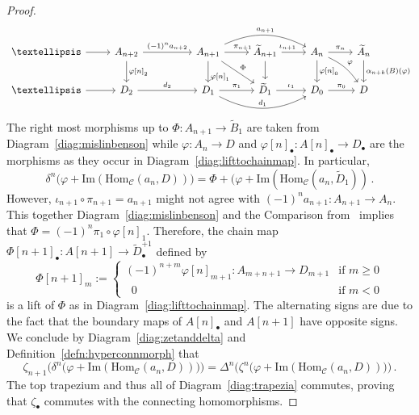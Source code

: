 \documentclass[12pt,a4paper]{article}
\numberwithin{equation}{section}
\theoremstyle{nonumberplain}
\newtheorem{proof}{Proof}
\begin{document}
\begin{proof}
\begin{equation}
\begin{tikzcd}
    {} \dots {} \arrow[r]
    & A_{n+2} \arrow[rr, "(-1)^n a_{n+2}"] \arrow[d, "\varphi{[}n{]}_2"]
    & & A_{n+1} \arrow[r, "\pi_{n+1}" near end] \arrow[rr, bend left = 26, "a_{n+1}"] \arrow[d, "\varphi{[}n{]}_1" near end] \arrow[dr, "\Phi"]
    & \widetilde{A}_{n+1} \arrow[r, "\iota_{n+1}" near start] \arrow[d]
    & A_n \arrow[r, "\pi_n"] \arrow[dr, bend left = 15, "\varphi"] \arrow[d, "\varphi{[}n{]}_0"]
    & \widetilde{A}_n \arrow[d, "\alpha_{n+k}(B)(\varphi)"] \\
    {} \dots {} \arrow[r]
    & D_2 \arrow[rr, "d_2"]
    & & D_1 \arrow[r, "\pi_1"] \arrow[rr, bend right = 28, "d_1"]
    & \widetilde{D}_1 \arrow[r, "\iota_1"]
    & D_0 \arrow[r, "\pi_0"]
    & D
\end{tikzcd}
\end{equation}
The right most morphisms up to $\Phi: A_{n+1} \rightarrow \widetilde{B}_1$ are taken from Diagram~\ref{diag:mislinbenson} while $\varphi: A_n \rightarrow D$ and $\varphi[n]_{\bullet}: A[n]_{\bullet} \rightarrow D_{\bullet}$ are the morphisms as they occur in Diagram~\ref{diag:lifttochainmap}. In particular,
\[ \delta^n \big(\varphi+\mathrm{Im}(\mathrm{Hom}_{\mathcal{C}}(a_n, D))\big) = \Phi+\big(\varphi+\mathrm{Im}(\mathrm{Hom}_{\mathcal{C}}(a_n, \widetilde{D}_1)) \, . \]
However, $\iota_{n+1} \circ \pi_{n+1} = a_{n+1}$ might not agree with $(-1)^n a_{n+1}: A_{n+1} \rightarrow A_n$. This together Diagram~\ref{diag:mislinbenson} and the Comparison from~\cite[p.~36]{wei94} implies that $\Phi = (-1)^n \pi_1 \circ \varphi[n]_1$. Therefore, the chain map $\Phi[n+1]_{\bullet}: A[n+1] \rightarrow \widetilde{D}_{\bullet}^{+1}$ defined by
\[ \Phi[n+1]_m := \begin{cases} (-1)^{n+m} \varphi[n]_{m+1}: A_{m+n+1} \rightarrow D_{m+1} &\text{if } m \geq 0 \\ \; \; 0 &\text{if } m < 0 \end{cases} \]
is a lift of $\Phi$ as in Diagram~\ref{diag:lifttochainmap}. The alternating signs are due to the fact that the boundary maps of $A[n]_{\bullet}$ and $A[n+1]$ have opposite signs. We conclude by Diagram~\ref{diag:zetanddelta} and Definition~\ref{defn:hyperconnmorph} that
\[ \zeta_{n+1}\Big(\delta^n \big(\varphi+\mathrm{Im}(\mathrm{Hom}_{\mathcal{C}}(a_n, D))\big)\Big) = \Delta^n \Big(\zeta^n \big(\varphi+\mathrm{Im}(\mathrm{Hom}_{\mathcal{C}}(a_n, D))\big)\Big) \, . \]
The top trapezium and thus all of Diagram~\ref{diag:trapezia} commutes, proving that $\zeta_{\bullet}$ commutes with the connecting homomorphisms.
\end{proof}
\end{document}
